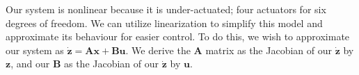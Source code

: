 \documentclass{article}
\begin{document}
\begin{multicols}{2}
Our system is nonlinear because it is under-actuated; four actuators for six degrees of freedom. We can utilize linearization to simplify this model and approximate its behaviour for easier control. To do this, we wish to approximate our system as $\boldsymbol{\dot{z}}=\boldsymbol{A}\boldsymbol{x}+\boldsymbol{B}\boldsymbol{u}$. We derive the $\boldsymbol{A}$ matrix as the Jacobian of our $\boldsymbol{\dot{z}}$ by $\boldsymbol{z}$, and our $\boldsymbol{B}$ as the Jacobian of our $\boldsymbol{\dot{z}}$ by $\boldsymbol{u}$. 



\end{multicols}
\end{document}
